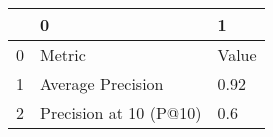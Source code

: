 \begin{tabular}{lll}
\toprule
{} &                       0 &      1 \\
\midrule
0 &                  Metric &  Value \\
1 &       Average Precision &   0.92 \\
2 &  Precision at 10 (P@10) &    0.6 \\
\bottomrule
\end{tabular}
